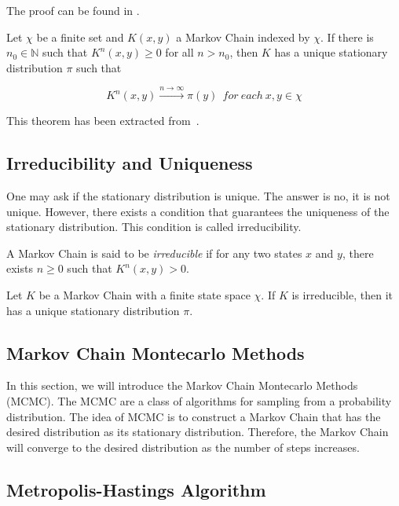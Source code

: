 \documentclass{report}
\begin{document}
The proof can be found in \cite{diaconis2008markov}.

\begin{theorem}
	Let \(\chi\) be a finite set and \(K(x,y)\) a Markov Chain indexed by $\chi$. If there is $n_0 \in \mathbb{N}$ such that \(K^n(x,y) \geq 0\) for all \(n > n_0\), then $K$ has a unique stationary distribution $\pi$ such that

	\[
		K^n(x,y) \xrightarrow{n \to \infty} \pi(y) \  \ for \ each \ x, y \in \chi
	\]
\end{theorem}

This theorem has been extracted from~\cite{reygner2023methodes}. 

\subsection{Irreducibility and Uniqueness}
\label{sec:irreducibility_uniqueness}

One may ask if the stationary distribution is unique. The answer is no, it is not unique. However, there exists a condition that guarantees the uniqueness of the stationary distribution. This condition is called irreducibility. 

\begin{definition}
	A Markov Chain is said to be \textit{irreducible} if for any two states $x$ and $y$, there exists $n \geq 0$ such that $K^n(x,y) > 0$.
\end{definition}

\begin{proposition}
	Let $K$ be a Markov Chain with a finite state space $\chi$. If $K$ is irreducible, then it has a unique stationary distribution $\pi$.
\end{proposition}

\subsection{Markov Chain Montecarlo Methods}
\label{sec:markov_chain_montecarlo}

In this section, we will introduce the Markov Chain Montecarlo Methods (MCMC). The MCMC are a class of algorithms for sampling from a probability distribution. The idea of MCMC is to construct a Markov Chain that has the desired distribution as its stationary distribution. Therefore, the Markov Chain will converge to the desired distribution as the number of steps increases.

\subsection{Metropolis-Hastings Algorithm}
\label{sec:metropolis_hastings}
\end{document}
